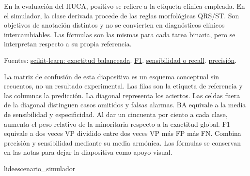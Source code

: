 {\begin{frame}[c]
{En la evaluación del HUCA, positivo se refiere a la etiqueta clínica empleada. En el simulador, la clase derivada procede de las reglas morfológicas QRS/ST. Son objetivos de anotación distintos y no se convierten en diagnósticos clínicos intercambiables. Las fórmulas son las mismas para cada tarea binaria, pero se interpretan respecto a su propia referencia.

Fuentes: \href{https://scikit-learn.org/stable/modules/generated/sklearn.metrics.balanced_accuracy_score.html}{scikit-learn: exactitud balanceada}. \href{https://scikit-learn.org/stable/modules/generated/sklearn.metrics.f1_score.html}{F1}. \href{https://scikit-learn.org/stable/modules/generated/sklearn.metrics.recall_score.html}{sensibilidad o recall}. \href{https://scikit-learn.org/stable/modules/generated/sklearn.metrics.precision_score.html}{precisión}.

La matriz de confusión de esta diapositiva es un esquema conceptual sin recuentos, no un resultado experimental. Las filas son la etiqueta de referencia y las columnas la predicción. La diagonal representa los aciertos. Las celdas fuera de la diagonal distinguen casos omitidos y falsas alarmas. BA equivale a la media de sensibilidad y especificidad. Al dar un cincuenta por ciento a cada clase, aumenta el peso relativo de la minoritaria respecto a la exactitud global. F1 equivale a dos veces VP dividido entre dos veces VP más FP más FN. Combina precisión y sensibilidad mediante su media armónica. Las fórmulas se conservan en las notas para dejar la diapositiva como apoyo visual.}
\end{frame}}

\expandafter\newcommand\csname Slideescenario_simulador


